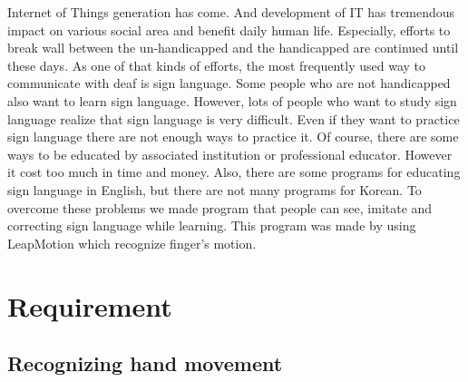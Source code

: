 \documentclass[10pt,journal,compsoc]{IEEEtran}
\begin{document}
% 
% 
% 
% 
 Internet of Things generation has come. And development of IT has tremendous impact on various social area and benefit daily human life. Especially, efforts to break wall between the un-handicapped and the handicapped are continued until these days. As one of that kinds of efforts, the most frequently used way to communicate with deaf is sign language. Some people who are not handicapped also want to learn sign language. However, lots of people who want to study sign language realize that sign language is very difficult. Even if they want to practice sign language there are not enough ways to practice it. Of course, there are some ways to be educated by associated institution or professional educator. However it cost too much in time and money. Also, there are some programs for educating sign language in English, but there are not many programs for Korean. To overcome these problems we made program that people can see, imitate and correcting sign language while learning. This program was made by using LeapMotion which recognize finger’s motion.\\

\hfill 
 
\hfill 

\IEEEpeerreviewmaketitle

\ifCLASSOPTIONcompsoc
{}
\else
\section{Requirement}
\label{sec:Requirement}
\fi



\subsection{Recognizing hand movement\\}
\end{document}
